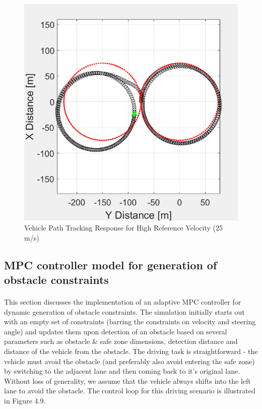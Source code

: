 \begin{figure}[H]\label{fig4.8}
\centering \includegraphics[scale=0.8]{Images/high_velocity_tracking_response.png}
\caption{Vehicle Path Tracking Response for High Reference Velocity (25 m/s)}
\end{figure}

\subsection{MPC controller model for generation of obstacle constraints}
\paragraph{}
This section discusses the implementation of an adaptive MPC controller for dynamic generation of obstacle constraints. The simulation initially starts out with an empty set of constraints (barring the constraints on velocity and steering angle) and updates them upon detection of an obstacle based on several parameters such as obstacle \& safe zone dimensions, detection distance and distance of the vehicle from the obstacle. The driving task is straightforward - the vehicle must avoid the obstacle (and preferably also avoid entering the safe zone) by switching to the adjacent lane and then coming back to it's original lane. Without loss of generality, we assume that the vehicle always shifts into the left lane to avoid the obstacle. The control loop for this driving scenario is illustrated in Figure 4.9.

